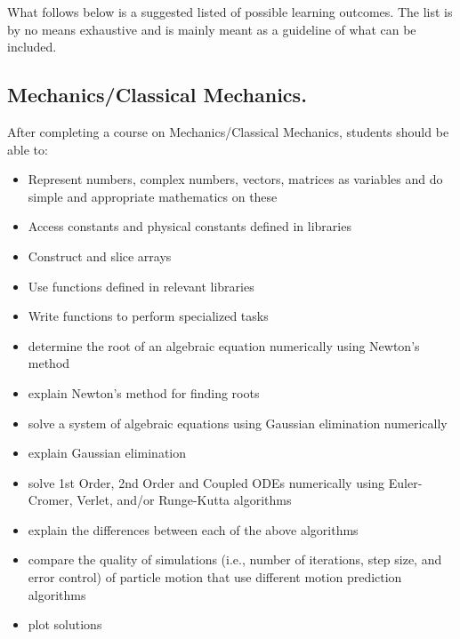 \documentclass[graybox,envcountchap,sectrefs]{svmult}
\begin{document}
What follows below is a suggested listed of possible learning
outcomes. The list is by no means exhaustive and is mainly meant as a
guideline of what can be included.


\subsection{Mechanics/Classical Mechanics.}
After completing a course on Mechanics/Classical Mechanics, students should be able to:
\begin{itemize}
\item Represent numbers, complex numbers, vectors, matrices as variables and do simple and appropriate mathematics on these

\item Access constants and physical constants defined in libraries

\item Construct and slice arrays

\item Use functions defined in relevant libraries

\item Write functions to perform specialized tasks

\item determine the root of an algebraic equation numerically using Newton's method

\item explain Newton's method for finding roots

\item solve a system of algebraic equations using Gaussian elimination numerically

\item explain Gaussian elimination

\item solve 1st Order, 2nd Order and Coupled ODEs numerically using Euler-Cromer, Verlet, and/or Runge-Kutta algorithms

\item explain the differences between each of the above algorithms

\item compare the quality of simulations (i.e., number of iterations, step size, and error control) of particle motion that use different motion prediction algorithms

\item plot solutions
\end{itemize}
\end{document}
